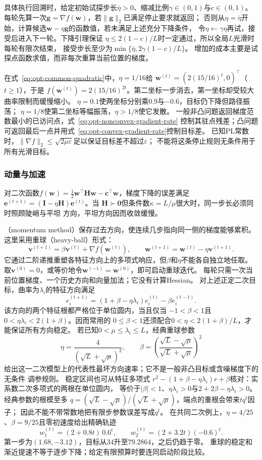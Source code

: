 具体执行回溯时，给定初始试探步长$\bar\eta>0$、缩减比例$\gamma\in(0,1)$与$c\in(0,1)$。
每轮先算一次$\bm g=\nabla f(\bm w)$，若$\|\bm g\|_2$已满足停止要求就返回；
否则从$\eta=\bar\eta$开始，计算候选$\bm w-\eta\bm g$的函数值，若未满足上述充分下降条件，
令$\eta\leftarrow\gamma\eta$再试，接受后进入下一轮。下降引理保证
$\eta\leq2(1-c)/L$时一定通过，所以全局$L$光滑时每轮有限次结束，
接受步长至少为$\min\{\bar\eta,2\gamma(1-c)/L\}$。
增加的成本主要是试探点函数求值，而非每次重算当前位置的梯度。

在式~\eqref{eq:opt-common-quadratic}中，$\eta=1/16$给
$\bm w^{(t)}=(2(15/16)^t,0)^\top$（$t\geq1$），于是
$f(\bm w^{(t)})=2(15/16)^{2t}$。第二坐标一步消去，第一坐标却受较大曲率限制而缓慢缩小。
$\eta=0.1$使两坐标分别乘$0.9$与$-0.6$，目标仍下降但路径振荡；
$\eta=1/8$使第二坐标等幅振荡，$\eta>1/8$使它发散。
一般非凸问题返回梯度范数最小的已访问点，式~\eqref{eq:opt-nonconvex-gradient-rate}
控制其驻点残差；凸问题可返回最后一点并用式~\eqref{eq:opt-convex-gradient-rate}控制目标差。
已知PL常数时，$\|\nabla f\|_2\leq\sqrt{2\mu\varepsilon}$足以保证目标差不超过$\varepsilon$；
不能将这条停止规则无条件用于所有光滑目标。

\subsubsection{动量与加速}
\label{sec:opt-curvature-acceleration}

对二次函数$f(\bm{w})=\frac12\bm{w}^{\top}\bm{H}\bm{w}
-\bm{c}^{\top}\bm{w}$，梯度下降的误差满足
$\bm{e}^{(t+1)}=(\bm{I}-\eta\bm{H})\bm{e}^{(t)}$。当
$\bm{H}\succ\bm{0}$但条件数$\kappa=L/\mu$很大时，同一步长必须同时照顾陡峭与平坦
方向，平坦方向因而收敛缓慢。

（momentum method）保存过去方向，使连续几步指向同一侧的梯度能够累积。
这里采用重球（heavy-ball）形式：
\[
  \bm{v}^{(t+1)}=\beta\bm{v}^{(t)}+\nabla f(\bm{w}^{(t)}),
  \qquad
  \bm{w}^{(t+1)}=\bm{w}^{(t)}-\eta\bm{v}^{(t+1)}.
\]
它通过二阶递推重塑各特征方向上的多项式响应，但$\beta$和$\eta$不能各自独立地任取。
取$\bm v^{(0)}=0$，或等价地令$\bm w^{(-1)}=\bm w^{(0)}$，即可启动重球迭代。
每轮只需一次当前位置梯度、一个历史方向和向量加法；它没有计算Hessian。
对上述正定二次目标，曲率为$\lambda_i$的特征方向满足
\[
  e_i^{(t+1)}
  =(1+\beta-\eta\lambda_i)e_i^{(t)}-\beta e_i^{(t-1)}.
\]
该方向的两个特征根都严格位于单位圆内，当且仅当
$-1<\beta<1$且$0<\eta\lambda_i<2(1+\beta)$。因而常用的
$0\leq\beta<1$还须配合$0<\eta<2(1+\beta)/L$，才能保证所有方向稳定。
若已知$0<\mu\leq\lambda_i\leq L$，经典重球参数
\[
  \eta=\frac{4}{(\sqrt{L}+\sqrt{\mu})^2},
  \qquad
  \beta=\left(\frac{\sqrt{L}-\sqrt{\mu}}
  {\sqrt{L}+\sqrt{\mu}}\right)^2
\]
给出这一二次模型上的代表性最坏方向速率；它不是一般非凸目标或含噪梯度下的无条件
调参规则。
稳定区间也可从特征多项式
$r^2-(1+\beta-\eta\lambda_i)r+\beta$核对：实系数二次多项式的两根在单位圆内，
等价于$|\beta|<1$、$\eta\lambda_i>0$与$2+2\beta-\eta\lambda_i>0$。
经典参数的根模至多
$q=(\sqrt L-\sqrt\mu)/(\sqrt L+\sqrt\mu)$，端点的重根会带来$tq^t$因子；
因此不能不带常数地把有限步参数误差写成$q^t$。
在共同二次例上，$\eta=4/25$、$\beta=9/25$且零初速度给出精确轨迹
\[
 w_1^{(t)}=(2+0.8t)\,0.6^t,\qquad
 w_2^{(t)}=(2+3.2t)(-0.6)^t.
\]
第一步为$(1.68,-3.12)$，目标从$34$升至$79.2864$，之后仍趋于零。
重球的稳定和渐近提速不等于逐步下降；给定有限预算时要连同启动阶段比较。

